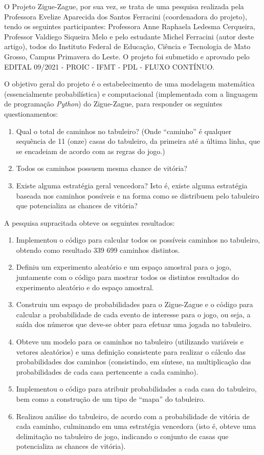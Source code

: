 \documentclass[12pt]{article}
\newcommand{\aspas}[1]{``#1''} %
\begin{document}
O Projeto Zigue-Zague, por sua vez, se trata de uma pesquisa realizada pela Professora Evelize Aparecida dos Santos Ferracini (coordenadora do projeto), tendo os seguintes participantes: Professora Anne Raphaela Ledesma Cerqueira, Professor Valdiego Siqueira Melo e pelo estudante Michel Ferracini (autor deste artigo), todos do Instituto Federal de Educação, Ciência e Tecnologia de Mato Grosso, Campus Primavera do Leste. O projeto foi submetido e aprovado pelo EDITAL 09/2021 - PROIC - IFMT - PDL - FLUXO CONTÍNUO.

O objetivo geral do projeto é o estabelecimento de uma modelagem matemática (essencialmente probabilística) e computacional (implementada com a linguagem de programação \textit{Python}) do Zigue-Zague, para responder os seguintes questionamentos:

\begin{enumerate}
	\item Qual o total de caminhos no tabuleiro? (Onde \aspas{caminho} é qualquer sequência de 11 (onze) casas do tabuleiro, da primeira até a última linha, que se encadeiam de acordo com as regras do jogo.)
	\item Todos os caminhos possuem mesma chance de vitória?
	\item Existe alguma estratégia geral vencedora? Isto é, existe alguma estratégia baseada nos caminhos possíveis e na forma como se distribuem pelo tabuleiro que potencializa as chances de vitória?
\end{enumerate}

A pesquisa supracitada obteve os seguintes resultados:

\begin{enumerate}
	\item Implementou o código para calcular todos os possíveis caminhos no tabuleiro, obtendo como resultado 339 699 caminhos distintos.
	\item Definiu um experimento aleatório e um espaço amostral para o jogo, juntamente com o código para mostrar todos os distintos resultados do experimento aleatório e do espaço amostral.
	\item Construiu um espaço de probabilidades para o Zigue-Zague e o código para calcular a probabilidade de cada evento de interesse para o jogo, ou seja, a saída dos números que deve-se obter para efetuar uma jogada no tabuleiro.
	\item Obteve um modelo para os caminhos no tabuleiro (utilizando variáveis e vetores aleatórios) e uma definição consistente para realizar o cálculo das probabilidades dos caminhos (consistindo, em síntese, na multiplicação das probabilidades de cada casa pertencente a cada caminho).
	\item Implementou o código para atribuir probabilidades a cada casa do tabuleiro, bem como a construção de um tipo de \aspas{mapa} do tabuleiro.
	\item Realizou análise do tabuleiro, de acordo com a probabilidade de vitória de cada caminho, culminando em uma estratégia vencedora (isto é, obteve uma delimitação no tabuleiro de jogo, indicando o conjunto de casas que potencializa as chances de vitória).
\end{enumerate}
\end{document}
